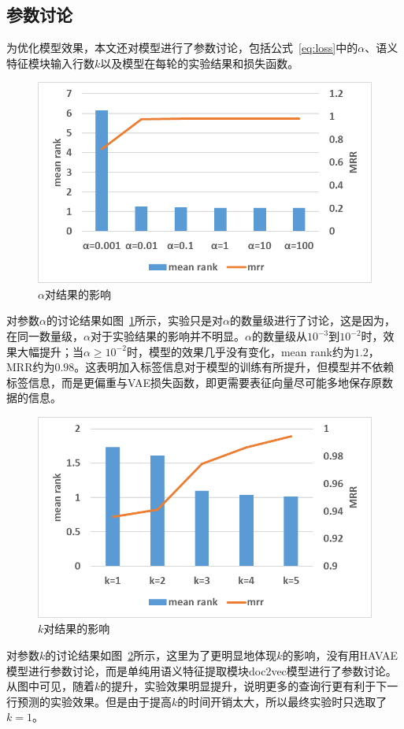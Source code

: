 \subsection{参数讨论}
为优化模型效果，本文还对模型进行了参数讨论，包括公式~\ref{eq:loss}中的$\alpha$、语义特征模块输入行数$k$以及模型在每轮的实验结果和损失函数。\par

\begin{figure}[h]
    \centering
    \includegraphics[width=12cm]{alpha.png}
    \caption{$\alpha$对结果的影响}
    \label{fig:alpha}
\end{figure}
对参数$\alpha$的讨论结果如图~\ref{fig:alpha}所示，实验只是对$\alpha$的数量级进行了讨论，这是因为，在同一数量级，$\alpha$对于实验结果的影响并不明显。$\alpha$的数量级从$10^{-3}$到$10^{-2}$时，效果大幅提升；当$\alpha \geq 10^{-2}$时，模型的效果几乎没有变化，mean rank约为$1.2$，MRR约为$0.98$。这表明加入标签信息对于模型的训练有所提升，但模型并不依赖标签信息，而是更偏重与VAE损失函数，即更需要表征向量尽可能多地保存原数据的信息。\par

\begin{figure}[h]
    \centering
    \includegraphics[width=12cm]{k.png}
    \caption{$k$对结果的影响}
    \label{fig:k}
\end{figure}
对参数$k$的讨论结果如图~\ref{fig:k}所示，这里为了更明显地体现$k$的影响，没有用HAVAE模型进行参数讨论，而是单纯用语义特征提取模块doc2vec模型进行了参数讨论。从图中可见，随着$k$的提升，实验效果明显提升，说明更多的查询行更有利于下一行预测的实验效果。但是由于提高$k$的时间开销太大，所以最终实验时只选取了$k=1$。\par

